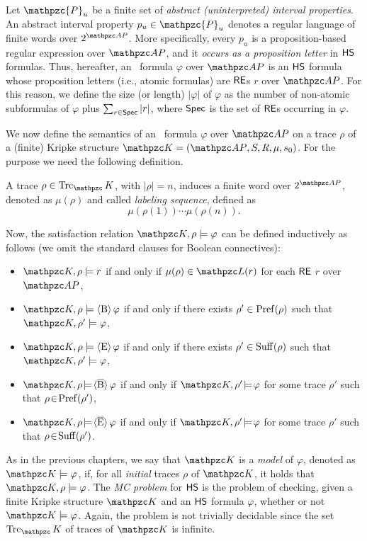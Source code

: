 Let $\mathpzc{P}_u$ be a finite set of \emph{abstract (uninterpreted) interval properties}.
An abstract interval property $p_u\in \mathpzc{P}_u$ denotes a regular language of finite words over $2^{\Prop}$.
More specifically,
every $p_u$ is a proposition-based regular expression over $\Prop$,
and it \emph{occurs as a proposition letter} in $\text{\sffamily HS}$ formulas. 
Thus, hereafter, an \HS\ formula $\varphi$ over $\Prop$ is an $\text{\sffamily HS}$ formula whose proposition letters (i.e., atomic formulas) are $\mathsf{RE}$s $r$ over $\Prop$.
%
For this reason, we define
the size (or length) $|\varphi |$ of $\varphi$ as the number of non-atomic subformulas of $\varphi$ plus $\sum_{r\in \textsf{Spec}} |r|$, where $\textsf{Spec}$ is the set of $\mathsf{RE}$s occurring in $\varphi$. 

We now define the semantics of an \HS\ formula $\varphi$ over $\Prop$ on a 
trace $\rho$ of a (finite) Kripke structure $\Ku=\KuDef$.
For the purpose we need the following definition.
\begin{definition}
 A trace $\rho\in\Trk_\Ku$, with $|\rho|=n$, induces a finite word over $2^{\Prop}$, denoted as $\mu(\rho)$ and called \emph{labeling sequence}, defined as \[\mu(\rho(1))\cdots \mu(\rho(n)).\]
\end{definition}
Now, the satisfaction relation $\Ku,\rho\models \varphi$ can be defined inductively as follows (we omit the standard clauses for Boolean connectives):
\begin{itemize}
    \item $\Ku,\rho   \models r$ if and only if $ \mu(\rho) \in \Lang(r)$ for each $\mathsf{RE}$ $r$ over $\Prop$,
    \item $\Ku,\rho  \models \hsB\varphi$ if and only if there exists $\rho'\in\operatorname{Pref}(\rho)$ such that $\Ku,\rho' \models \varphi$,
    \item $\Ku,\rho  \models \hsE\varphi$ if and only if there exists $\rho'\in\operatorname{Suff}(\rho)$ such that $\Ku,\rho' \models \varphi$,
    \item $\Ku,\rho   \!\models\! \hsBt\varphi$ if and only if $\Ku,\rho'   \!\models\! \varphi$ for some trace $\rho'$ such that $\rho\!\in\!\operatorname{Pref}(\rho')$, 
    \item $\Ku,\rho   \!\models\! \hsEt\varphi$ if and only if $\Ku,\rho'   \!\models\! \varphi$ for some trace $\rho'$ such that $\rho\!\in\!\operatorname{Suff}(\rho')$. 
\end{itemize} 

As in the previous chapters, 
we say that $\Ku$ is a \emph{model} of $\varphi$, denoted as $\Ku\models 
\varphi$, if, for all \emph{initial} traces $\rho$ of $\Ku$, it holds that 
$\Ku,\rho\models \varphi$. The \emph{MC problem} for $\text{\sffamily HS}$ is the problem of 
checking, given a finite Kripke structure $\Ku$ and an $\text{\sffamily HS}$ formula $\varphi$, 
whether or not $\Ku\models \varphi$. Again, the problem is not trivially 
decidable since the set $\Trk_\Ku$ of traces of $\Ku$ is infinite.

